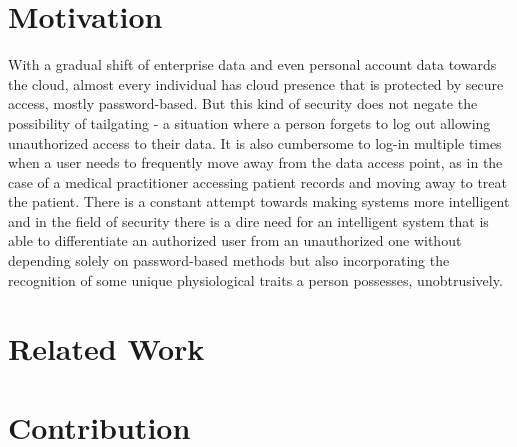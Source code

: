 \documentclass[%
        final,
        notitlepage,
        narroweqnarray,
        inline,
        ]{ieee}
\begin{document}
\section{Motivation}
With a gradual shift of enterprise data and even personal account data towards the cloud, almost every individual has cloud presence that is protected by secure access, mostly password-based. But this kind of security does not negate the possibility of tailgating - a situation where a person forgets to log out allowing unauthorized access to their data. It is also cumbersome to log-in multiple times when a user needs to frequently move away from the data access point, as in the case of a medical practitioner accessing patient records and moving away to treat the patient. There is a constant attempt towards making systems more intelligent and in the field of security there is a dire need for an intelligent system that is able to differentiate an authorized user from an unauthorized one without depending solely on password-based methods but also incorporating the recognition of some unique physiological traits a person possesses, unobtrusively.

\section{Related Work}


\section{Contribution}


\end{document}
